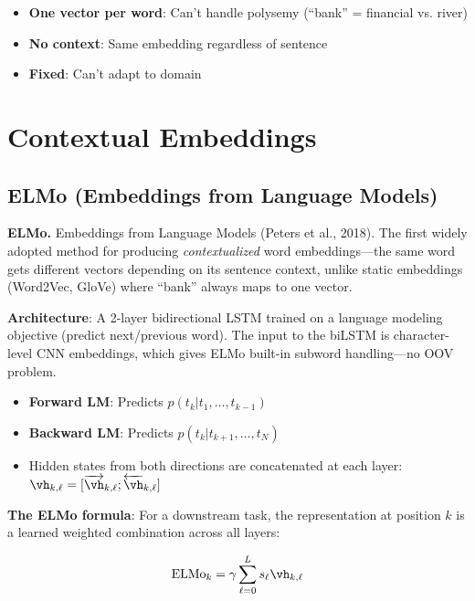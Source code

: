 \begin{itemize}
    \item \textbf{One vector per word}: Can't handle polysemy (``bank'' = financial vs. river)
    \item \textbf{No context}: Same embedding regardless of sentence
    \item \textbf{Fixed}: Can't adapt to domain
\end{itemize}

\section{Contextual Embeddings}
\label{sec:contextual}

\subsection{ELMo (Embeddings from Language Models)}

\textbf{ELMo.} Embeddings from Language Models (Peters et al., 2018). The first widely adopted method for producing \emph{contextualized} word embeddings---the same word gets different vectors depending on its sentence context, unlike static embeddings (Word2Vec, GloVe) where ``bank'' always maps to one vector.

\textbf{Architecture}: A 2-layer bidirectional LSTM trained on a language modeling objective (predict next/previous word). The input to the biLSTM is character-level CNN embeddings, which gives ELMo built-in subword handling---no OOV problem.

\begin{itemize}
    \item \textbf{Forward LM}: Predicts $p(t_{k} | t_1, \ldots, t_{k-1})$
    \item \textbf{Backward LM}: Predicts $p(t_{k} | t_{k+1}, \ldots, t_N)$
    \item Hidden states from both directions are concatenated at each layer: $\vh_{k,\ell} = [\overrightarrow{\vh}_{k,\ell} ; \overleftarrow{\vh}_{k,\ell}]$
\end{itemize}

\textbf{The ELMo formula}: For a downstream task, the representation at position $k$ is a learned weighted combination across all layers:

\begin{equation}
\text{ELMo}_k = \gamma \sum_{\ell=0}^{L} s_\ell \vh_{k,\ell}
\end{equation}

